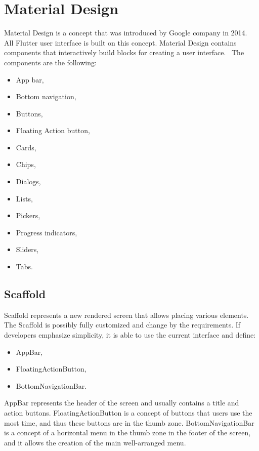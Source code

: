 \section{Material Design}\label{sec:android-specific-ui-widgets}
Material Design is a concept that was introduced by Google company in 2014.~\cite{materialDesignArticle}
All Flutter user interface is built on this concept.
Material Design contains components that interactively build blocks for creating a user interface.~\cite{materialDesign}
The components are the following:
\begin{itemize}
    \item App bar,
    \item Bottom navigation,
    \item Buttons,
    \item Floating Action button,
    \item Cards,
    \item Chips,
    \item Dialogs,
    \item Lists,
    \item Pickers,
    \item Progress indicators,
    \item Sliders,
    \item Tabs.
\end{itemize}

\subsection{Scaffold}\label{subsec:scaffold}
Scaffold represents a new rendered screen that allows placing various elements.
The Scaffold is possibly fully customized and change by the requirements.
If developers emphasize simplicity, it is able to use the current interface and define:
\begin{itemize}
    \item AppBar,
    \item FloatingActionButton,
    \item BottomNavigationBar.
\end{itemize}
AppBar represents the header of the screen and usually contains a title and action buttons.
FloatingActionButton is a concept of buttons that users use the most time, and thus these buttons are in the thumb zone.
BottomNavigationBar is a concept of a horizontal menu in the thumb zone in the footer of the screen, and it allows the creation of the main well-arranged menu.~\cite{flutterBook}
\newline


